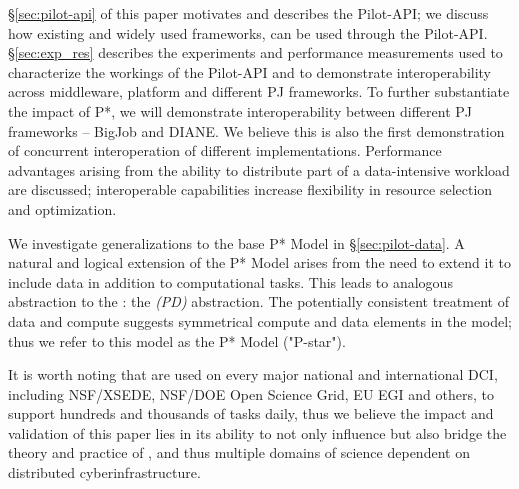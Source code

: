 \documentclass[conference]{IEEEtran}
\begin{document}


\S\ref{sec:pilot-api} of this paper motivates and describes the Pilot-API;  we
discuss how %
existing and widely used \pilotjob frameworks, can be used through the
Pilot-API.  \S\ref{sec:exp_res} describes the experiments and performance
measurements used to characterize the workings of the Pilot-API and to
demonstrate interoperability across middleware, platform and different
PJ frameworks.  To further substantiate the impact of P*, we will
demonstrate interoperability between different PJ frameworks -- BigJob
and DIANE. We believe this is also the first demonstration of
concurrent interoperation of different \pilotjob implementations.
Performance advantages arising from the ability to distribute part of a
data-intensive workload are discussed; interoperable capabilities
increase flexibility in resource selection and optimization.

We investigate generalizations to the base P* Model
in \S\ref{sec:pilot-data}.  A natural and logical extension of the
P* Model arises from the need to extend it to include data in
addition to computational tasks.  This leads to analogous abstraction
to the \pilotjob: the \emph{\pilotdata (PD)} abstraction.  The
potentially consistent treatment of data and compute suggests
symmetrical compute and data elements in the model; thus we refer
to this model as the P* Model ("P-star").


It is worth noting that \pilotjobs are used on every major
national and international DCI, including NSF/XSEDE,
NSF/DOE Open Science Grid, EU EGI and others, to support hundreds and
thousands of tasks daily, thus we believe the impact and validation of
this paper lies in its ability to not only influence but also bridge
the theory and practice of \pilotjobs, and thus multiple domains of
science dependent on distributed cyberinfrastructure.





\end{document}

